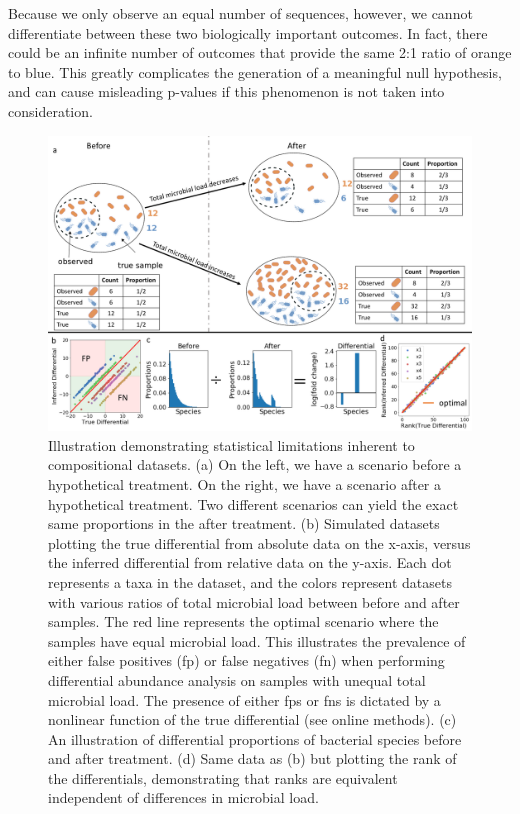 Because we only observe an equal number of sequences, however, we cannot differentiate between
these two biologically important outcomes. In fact, there could be an infinite number of outcomes
that provide the same 2:1 ratio of orange to blue. This greatly complicates the generation of a
meaningful null hypothesis, and can cause misleading p-values if this phenomenon is not taken
into consideration.\\[5 mm]
\begin{figure}
  \centering
  \includegraphics[width=1\textwidth]{ch4/Figure1.png}
  \caption[Illustration of total population size bias and the concept of differentials.]{
    Illustration demonstrating statistical limitations inherent to compositional datasets. (a) On the left,
    we have a scenario before a hypothetical treatment. On the right, we have a scenario after a hypothetical treatment.
    Two different scenarios can yield the exact same proportions in the after treatment. (b) Simulated datasets
    plotting the true differential from absolute data on the x-axis, versus the inferred differential from relative
    data on the y-axis. Each dot represents a taxa in the dataset, and the colors represent datasets with various
    ratios of total microbial load between before and after samples. The red line represents the optimal scenario
    where the samples have equal microbial load. This illustrates the prevalence of either false positives (\gls{fp}) or
    false negatives (\gls{fn}) when performing differential abundance analysis on samples with unequal total microbial load.
    The presence of either \gls{fp}s or \gls{fn}s is dictated by a nonlinear function of the true differential (see online methods).
    (c) An illustration of differential proportions of bacterial species before and after treatment. (d) Same data as
    (b) but plotting the rank of the differentials, demonstrating that ranks are equivalent independent of differences
    in microbial load.}
\end{figure}
